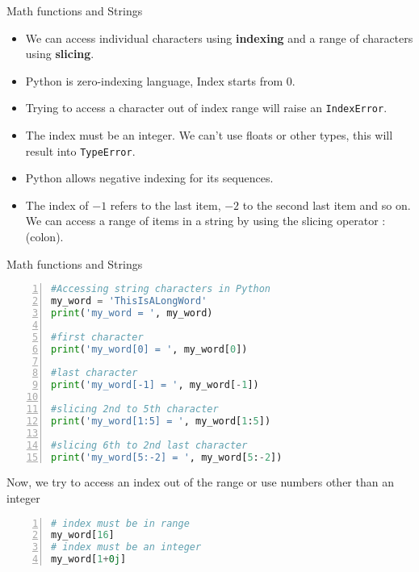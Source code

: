 \begin{frame}[fragile]{Math functions and Strings}
\begin{itemize}[<+->]
    \item We can access individual characters using {\bf indexing} and a range of characters using {\bf slicing}. 
    
    
    \item Python is zero-indexing language, Index starts from 0. 
    
    \item Trying to access a character out of index range will raise an \verb|IndexError|.
    \item The index must be an integer. We can't use floats or other types, this will result into \verb|TypeError|.
   \item Python allows negative indexing for its sequences.
   \item The index of $-1$ refers to the last item, $-2$ to the second last item and so on. We can access a range of items in a string by using the slicing operator :(colon).
\end{itemize}
\end{frame}
\begin{frame}[fragile]{Math functions and Strings}
\begin{lstlisting}[numbers=left,showstringspaces=false,language=python]
#Accessing string characters in Python
my_word = 'ThisIsALongWord'
print('my_word = ', my_word)

#first character
print('my_word[0] = ', my_word[0])

#last character
print('my_word[-1] = ', my_word[-1])

#slicing 2nd to 5th character
print('my_word[1:5] = ', my_word[1:5])

#slicing 6th to 2nd last character
print('my_word[5:-2] = ', my_word[5:-2])
\end{lstlisting}
\pause
Now, we try to access an index out of the range or use numbers other than an integer
\begin{lstlisting}[numbers=left,showstringspaces=false,language=python]
# index must be in range
my_word[16]  
# index must be an integer
my_word[1+0j] 
\end{lstlisting}

\end{frame}
